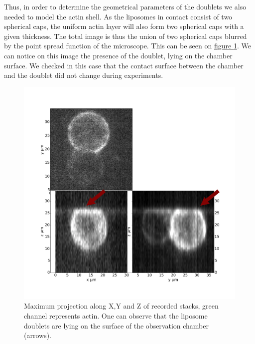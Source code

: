\documentclass[A4paperpaper,11pt,english]{sphinxmanual}
\begin{document}
Thus, in order to determine the geometrical parameters of the doublets we also needed
to model the actin shell. As the liposomes in contact consist of two spherical
caps, the uniform actin layer will also form two spherical caps with a given
thickness. The total image is thus the union of two spherical caps blurred by
the point spread function of the microscope. This can be seen on \hyperref[parts/part4:mproj1]{figure  \ref*{parts/part4:mproj1}}.  We can notice on this image the presence of the doublet, lying on the
chamber surface. We checked in this case that the contact surface between the
chamber and the doublet did not change during experiments.
\begin{figure}[htbp]
\centering
\capstart

\includegraphics[width=0.800\linewidth]{max_proj_340A.png}
\caption{Maximum projection along X,Y and Z of recorded stacks, green channel represents actin.
One can observe that the liposome doublets are lying on the surface of the
observation chamber (arrows).}\label{parts/part4:mproj1}\end{figure}
\end{document}
